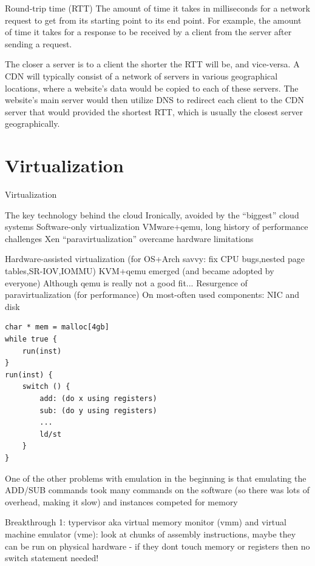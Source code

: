 \documentclass[fancy,11pt,titlestyle=display]{style/elegantbook}
\begin{document}
\begin{definition}{Round-trip time (RTT)}{}
The amount of time it takes in milliseconds for a network request to get from its starting point to its end point. For example, the amount of time it takes for a response to be received by a client from the server after sending a request.
\end{definition}
The closer a server is to a client the shorter the RTT will be, and vice-versa. A CDN will typically consist of a network of servers in various geographical locations, where a website's data would be copied to each of these servers. The website's main server would then utilize DNS to redirect each client to the CDN server that would provided the shortest RTT, which is usually the closest server geographically. 

\chapter{Virtualization}

\begin{introduction}[Topics]
\item Virtualization
\end{introduction}

The key technology behind the cloud
Ironically, avoided by the ``biggest'' cloud systems
Software-only virtualization
VMware+qemu, long history of performance challenges
Xen ``paravirtualization'' overcame hardware limitations

Hardware-assisted virtualization
(for OS+Arch savvy: fix CPU bugs,nested page tables,SR-IOV,IOMMU)
KVM+qemu emerged (and became adopted by everyone)
Although qemu is really not a good fit...
Resurgence of paravirtualization (for performance)
On most-often used components: NIC and disk

\begin{lstlisting}
char * mem = malloc[4gb]
while true {
    run(inst)
}
run(inst) {
    switch () {
        add: (do x using registers)
        sub: (do y using registers)
        ...
        ld/st 
    }
}
\end{lstlisting}


\par One of the other problems with emulation in the beginning is that emulating the ADD/SUB commands took many commands on the software (so there was lots of overhead, making it slow) and instances competed for memory 

\par Breakthrough 1: typervisor aka virtual memory monitor (vmm) and virtual machine emulator (vme): look at chunks of assembly instructions, maybe they can be run on physical hardware - if they dont touch memory or registers then no switch statement needed! 
\end{document}
